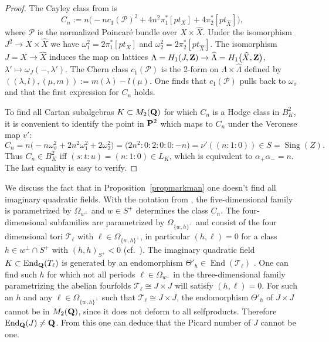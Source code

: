 \documentclass[pdftex]{sigma}
\numberwithin{equation}{section}
\begin{document}
\begin{proof}The Cayley class from \cite[Proposition~11.2]{Markman} is
\[
C_n := n\big({-}nc_1({\mathcal P})^2 + 4n^2\pi_1^*[pt_X] + 4\pi_2^*[pt_{\hat{X}}]\big),
\]
where ${\mathcal P}$ is the normalized Poincar\'e bundle over $X\times\widehat{X}$.
Under the isomorphism $J^2\rightarrow X\times \widehat{X}$ we have $\omega_1^2=2\pi_1^*[pt_X]$
and $\omega_2^2=2\pi_2^*[pt_{\hat{X}}]$.
The isomorphism $J=X\rightarrow \widehat{X}$ induces the map on lattices
$\Lambda=H_1(J,{\bf Z})\rightarrow \widehat{\Lambda}=H_1\big(\widehat{X},{\bf Z}\big)$,
$\lambda'\mapsto \omega_J(-,\lambda')$.
The Chern class $c_1({\mathcal P})$
is the 2-form on $\Lambda\times\widehat{\Lambda}$ defined by
$((\lambda,l),(\mu,m)):=m(\lambda)-l(\mu)$.
One finds that $c_1({\mathcal P})$ pulls back to $\omega_\sigma$ and that the first expression for
$C_n$ holds.

To find all Cartan subalgebras $K\subset M_2({\bf Q})$ for which $C_n$ is a Hodge class in $B^2_K$,
it is convenient to identify the point in ${\bf P}^2$ which maps to $C_n$ under the Veronese map $v'$:
\[
C_n = n\big({-}n\omega_\sigma^2 + 2n^2\omega_1^2 + 2\omega_2^2\big)
 = \big(2n^2:0:2:0:0:-n\big) = \nu'((n:1:0)) \in S = \operatorname{Sing}(Z).
\]
Thus $C_n\in B^2_K$ iff $(s:t:u)=(n:1:0)\in L_K$, which is equivalent to $\alpha_+\alpha_-=n$.
The last equality is easy to verify.
\end{proof}

\begin{Remark}\label{cayT} We discuss the fact that in Proposition~\ref{propmarkman} one doesn't find
all imaginary quadratic fields.
With the notation from \cite[Section~12]{Markman}, the five-dimensional family is pa\-ra\-met\-rized
by $\Omega_{w^\perp}$ and $w\in S^+$ determines the class $C_n$.
The four-dimensional subfamilies are parametrized by $\Omega_{\{w,h\}^\perp}$ and
consist of the four dimensional tori ${\mathcal T}_\ell$ with
$\ell\in \Omega_{\{w,h\}^\perp}$, in particular $(h,\ell)=0$ for a class $h\in w^\perp\cap S^+$ with
$(h,h)_{S^+}<0$ (cf.\ \cite[formula~(12.6), Corollary~12.9]{Markman}). The imaginary quadratic field $K\subset \operatorname{End}_{\bf Q}(T_\ell)$ is generated by an endomorphism $\Theta'_h\in \operatorname{End}({\mathcal T}_\ell)$ \cite[Lemma 12.5]{Markman}.
One can find such $h$ for which not all periods $\ell\in \Omega_{w^\perp}$ in the three-dimensional family parametrizing the abelian fourfolds ${\mathcal T}_\ell\cong J\times J$ will satisfy $(h,\ell)=0$.
For such an $h$ and any $\ell\in\Omega_{\{w,h\}^\perp}$ such that ${\mathcal T}_\ell\cong J\times J$,
the endomorphism $\Theta'_h$ of $J\times J$ cannot be in $M_2({\bf Q})$,
since it does not deform to all selfproducts.
Therefore $\operatorname{End}_{\bf Q}(J)\neq {\bf Q}$. From this one can deduce that the Picard number of $J$ cannot be one.
\end{Remark}
\end{document}
